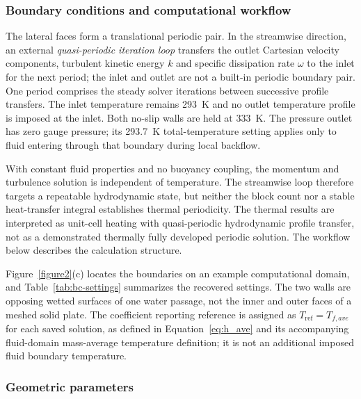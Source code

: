 \documentclass[energies,article,submit,moreauthors,noheaderline]{Definitions/mdpi}
\begin{document}
\subsubsection{Boundary conditions and computational workflow}
\label{sec:periodic_boundary}

The lateral faces form a translational periodic pair. In the streamwise direction, an external \emph{quasi-periodic iteration loop} transfers the outlet Cartesian velocity components, turbulent kinetic energy $k$ and specific dissipation rate $\omega$ to the inlet for the next period; the inlet and outlet are not a built-in periodic boundary pair. One period comprises the steady solver iterations between successive profile transfers. The inlet temperature remains 293~K and no outlet temperature profile is imposed at the inlet. Both no-slip walls are held at 333~K. The pressure outlet has zero gauge pressure; its 293.7~K total-temperature setting applies only to fluid entering through that boundary during local backflow.

With constant fluid properties and no buoyancy coupling, the momentum and turbulence solution is independent of temperature. The streamwise loop therefore targets a repeatable hydrodynamic state, but neither the block count nor a stable heat-transfer integral establishes thermal periodicity. The thermal results are interpreted as unit-cell heating with quasi-periodic hydrodynamic profile transfer, not as a demonstrated thermally fully developed periodic solution. The workflow below describes the calculation structure.

Figure~\ref{figure2}(c) locates the boundaries on an example computational domain, and Table~\ref{tab:bc-settings} summarizes the recovered settings. The two walls are opposing wetted surfaces of one water passage, not the inner and outer faces of a meshed solid plate. The coefficient reporting reference is assigned as $T_{\mathrm{ref}}=T_{f,ave}$ for each saved solution, as defined in Equation~\eqref{eq:h_ave} and its accompanying fluid-domain mass-average temperature definition; it is not an additional imposed fluid boundary temperature.





\subsubsection{Geometric parameters}
\label{sec:geometric_parameters}
\end{document}
